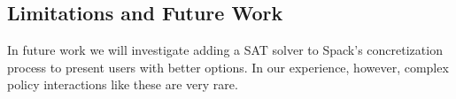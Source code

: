
\subsection{Limitations and Future Work}

In future work we will investigate adding a SAT solver to Spack's
concretization process to present users with better options.  In our
experience, however, complex policy interactions like these are very
rare.
